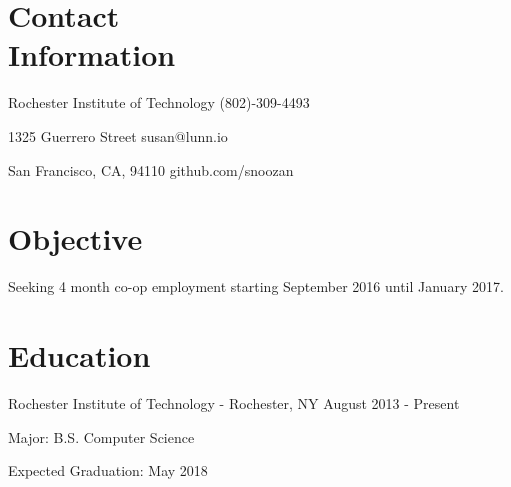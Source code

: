 \documentclass[a4paper,margin,line]{resume}
\newcommand{\rdate}[1]{\hfill {\small #1}}
\begin{document}
\begin{resume}
\section{\mysidestyle Contact \\ Information} \vspace{2mm}
	\begin{asparablank}
		\item Rochester Institute of Technology \hfill (802)-309-4493
		\item 1325 Guerrero Street \hfill susan@lunn.io
		\item San Francisco, CA, 94110 \hfill github.com/snoozan
	\end{asparablank}

\section{\mysidestyle Objective}
	\begin{asparablank}
    	\item Seeking 4 month co-op employment starting September 2016 until January 2017.
	\end{asparablank}

\section{\mysidestyle Education}
	\begin{compactdesc}
		\item[Rochester Institute of Technology] - Rochester, NY \rdate{August 2013 - Present}
		\begin{asparablank} { \small
			\item Major: B.S. Computer Science
		} \end{asparablank}
		\begin{asparablank} { \small
			\item Expected Graduation: May 2018
		} \end{asparablank}
	\end{compactdesc}


\end{resume}
\end{document}
